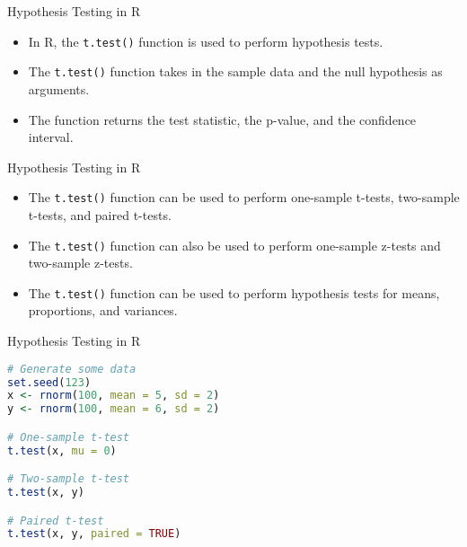 \documentclass[serif, 9pt, aspectratio=32]{beamer}
\begin{document}
\begin{frame}{Hypothesis Testing in R}
    \begin{itemize}
        \setlength{\itemsep}{2em}
        \item In R, the \texttt{t.test()} function is used to perform hypothesis tests.
        \item The \texttt{t.test()} function takes in the sample data and the null hypothesis as arguments.
        \item The function returns the test statistic, the p-value, and the confidence interval.
    \end{itemize}
\end{frame}

\begin{frame}{Hypothesis Testing in R}
    \begin{itemize}
        \setlength{\itemsep}{2em}
        \item The \texttt{t.test()} function can be used to perform one-sample t-tests, two-sample t-tests, and paired t-tests.
        \item The \texttt{t.test()} function can also be used to perform one-sample z-tests and two-sample z-tests.
        \item The \texttt{t.test()} function can be used to perform hypothesis tests for means, proportions, and variances.
    \end{itemize}
\end{frame}

\begin{frame}[fragile]{Hypothesis Testing in R}
    \begin{lstlisting}[language=R]
# Generate some data
set.seed(123)
x <- rnorm(100, mean = 5, sd = 2)
y <- rnorm(100, mean = 6, sd = 2)

# One-sample t-test
t.test(x, mu = 0)

# Two-sample t-test
t.test(x, y)

# Paired t-test
t.test(x, y, paired = TRUE)
    \end{lstlisting}
\end{frame}
\end{document}
